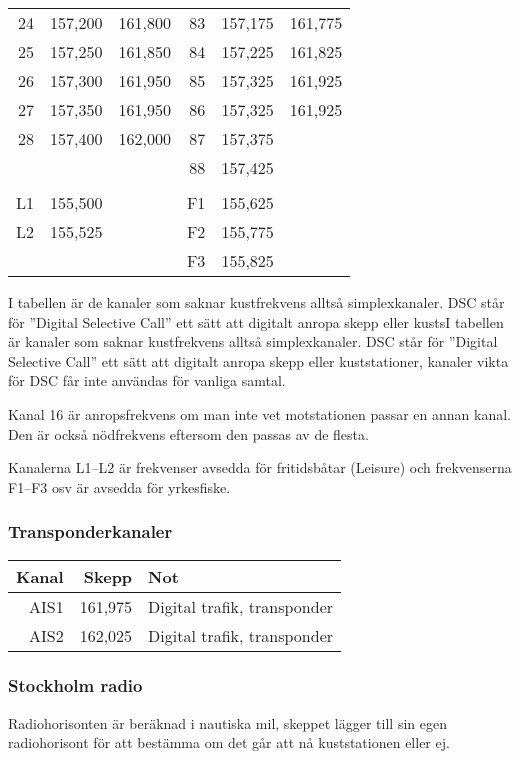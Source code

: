 \begin{longtable}{rrr|rrr}
24 & 157,200 & 161,800 & 83 & 157,175 & 161,775 \\
25 & 157,250 & 161,850 & 84 & 157,225 & 161,825 \\
26 & 157,300 & 161,950 & 85 & 157,325 & 161,925 \\
27 & 157,350 & 161,950 & 86 & 157,325 & 161,925 \\
28 & 157,400 & 162,000 & 87 & 157,375 & \\
   &         &         & 88 & 157,425 & \\
   &         &         &    &         & \\
L1 & 155,500 &         & F1 & 155,625 & \\
L2 & 155,525 &         & F2 & 155,775 & \\
   &         &         & F3 & 155,825 & \\
\end{longtable}

I tabellen är de kanaler som saknar kustfrekvens alltså simplexkanaler. DSC står för ''Digital Selective Call'' ett sätt att digitalt anropa skepp eller kustsI tabellen är kanaler som saknar kustfrekvens alltså simplexkanaler. DSC står för ''Digital Selective Call'' ett sätt att digitalt anropa skepp eller kuststationer, kanaler vikta för DSC får inte användas för vanliga samtal.

Kanal 16 är anropsfrekvens om man inte vet motstationen passar en annan kanal. Den är också nödfrekvens eftersom den passas av de flesta. 

Kanalerna L1--L2 är frekvenser avsedda för fritidsbåtar (Leisure) och frekvenserna F1--F3 osv är avsedda för yrkesfiske.

\subsubsection{Transponderkanaler}
\begin{longtable}{rrl}
	\textbf{Kanal} & \textbf{Skepp} & \textbf{Not} \\ \hline
	   \endhead
AIS1 & 161,975 & Digital trafik, transponder\\
AIS2 & 162,025 & Digital trafik, transponder\\
\end{longtable}

\subsubsection{Stockholm radio}

Radiohorisonten är beräknad i nautiska mil, skeppet lägger till sin egen radiohorisont för att bestämma om det går att nå kuststationen eller ej.

